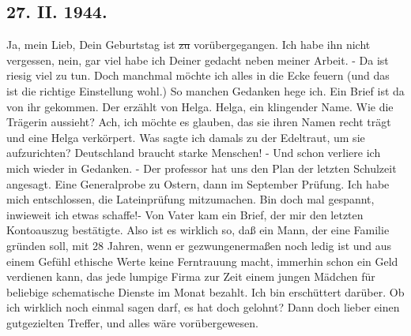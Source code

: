 \subsection{27. II. 1944.}

Ja, mein Lieb, Dein Geburtstag ist \st{zu} vor\"{u}bergegangen.
Ich habe ihn nicht vergessen, nein, gar viel habe ich Deiner gedacht neben meiner Arbeit.
- Da ist riesig viel zu tun.
Doch manchmal m\"{o}chte ich alles in die Ecke feuern (und das ist die richtige Einstellung wohl.)
So manchen Gedanken hege ich.
Ein Brief ist da von ihr gekommen.
Der erz\"{a}hlt von Helga.
Helga, ein klingender Name.
Wie die Tr\"{a}gerin aussieht?
Ach, ich m\"{o}chte es glauben, das sie ihren Namen recht tr\"{a}gt und eine Helga verk\"{o}rpert.
Was sagte ich damals zu der Edeltraut, um sie aufzurichten?
Deutschland braucht starke Menschen!
- Und schon verliere ich mich wieder in Gedanken.
- Der professor hat uns den Plan der letzten Schulzeit angesagt.
Eine Generalprobe zu Ostern, dann im September Pr\"{u}fung.
Ich habe mich entschlossen, die Lateinpr\"{u}fung mitzumachen.
Bin doch mal gespannt, inwieweit ich etwas schaffe!-
Von Vater kam ein Brief, der mir den letzten Kontoauszug best\"{a}tigte.
Also ist es wirklich so, da{\ss} ein Mann, der eine Familie gr\"{u}nden soll, mit 28 Jahren, wenn er gezwungenerma{\ss}en noch ledig ist und aus einem Gef\"{u}hl ethische Werte keine Ferntrauung macht, immerhin schon ein Geld verdienen kann, das jede lumpige Firma zur Zeit einem jungen M\"{a}dchen f\"{u}r beliebige schematische Dienste im Monat bezahlt.
Ich bin ersch\"{u}ttert dar\"{u}ber.
Ob ich wirklich noch einmal sagen darf, es hat doch gelohnt?
Dann doch lieber einen gutgezielten Treffer, und alles w\"{a}re vor\"{u}bergewesen.

\clearpage
